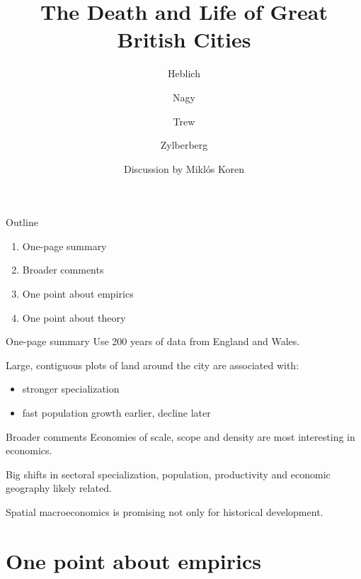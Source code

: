 \documentclass[
  ignorenonframetext,
  aspectratio=16,
]{beamer}
\title{The Death and Life of Great British Cities}
\author{Heblich \and Nagy \and Trew \and Zylberberg}
\date{Discussion by Miklós Koren}
\providecommand{\tightlist}{%
  \setlength{\itemsep}{0pt}\setlength{\parskip}{0pt}}
\begin{document}
\frame{\titlepage}

\begin{frame}{Outline}
\protect\hypertarget{outline}{}
\begin{enumerate}
\tightlist
\item
  One-page summary
\item
  Broader comments
\item
  One point about empirics
\item
  One point about theory
\end{enumerate}
\end{frame}

\begin{frame}{One-page summary}
\protect\hypertarget{one-page-summary}{}
Use 200 years of data from England and Wales.

Large, contiguous plots of land around the city are associated with:

\begin{itemize}
\tightlist
\item
  stronger specialization
\item
  fast population growth earlier, decline later
\end{itemize}
\end{frame}

\begin{frame}{Broader comments}
\protect\hypertarget{broader-comments}{}
Economies of scale, scope and density are most interesting in economics.

Big shifts in sectoral specialization, population, productivity and
economic geography likely related.

Spatial macroeconomics is promising not only for historical development.
\end{frame}

\hypertarget{one-point-about-empirics}{%
\section{One point about empirics}\label{one-point-about-empirics}}
\end{document}
